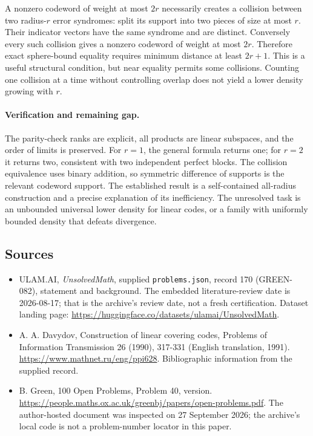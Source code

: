 \documentclass[11pt,a4paper]{article}
\begin{document}
A nonzero codeword of weight at most $2r$ necessarily creates a collision between two radius-$r$ error syndromes: split its support into two pieces of size at most $r$. Their indicator vectors have the same syndrome and are distinct. Conversely every such collision gives a nonzero codeword of weight at most $2r$. Therefore exact sphere-bound equality requires minimum distance at least $2r+1$. This is a useful structural condition, but near equality permits some collisions. Counting one collision at a time without controlling overlap does not yield a lower density growing with $r$.

\paragraph{Verification and remaining gap.}
The parity-check ranks are explicit, all products are linear subspaces, and the order of limits is preserved. For $r=1$, the general formula returns one; for $r=2$ it returns two, consistent with two independent perfect blocks. The collision equivalence uses binary addition, so symmetric difference of supports is the relevant codeword support. The established result is a self-contained all-radius construction and a precise explanation of its inefficiency. The unresolved task is an unbounded universal lower density for linear codes, or a family with uniformly bounded density that defeats divergence.

\subsection{Sources}

{\small

\begin{itemize}

\item[\hypertarget{source:170:1}{S1}] ULAM.AI, \emph{UnsolvedMath}, supplied \texttt{problems.json}, record 170 (GREEN-082), statement and background. The embedded literature-review date is 2026-08-17; that is the archive’s review date, not a fresh certification. Dataset landing page: \url{https://huggingface.co/datasets/ulamai/UnsolvedMath}.

\item[\hypertarget{source:170:2}{S2}] A. A. Davydov, Construction of linear covering codes, Problems of Information Transmission 26 (1990), 317-331 (English translation, 1991). \url{https://www.mathnet.ru/eng/ppi628}. Bibliographic information from the supplied record.

\item[\hypertarget{source:170:3}{S3}] B. Green, 100 Open Problems, Problem 40, version. \url{https://people.maths.ox.ac.uk/greenbj/papers/open-problems.pdf}. The author-hosted document was inspected on 27 September 2026; the archive’s local code is not a problem-number locator in this paper.

\end{itemize}

}

\label{end:170}
\end{document}
